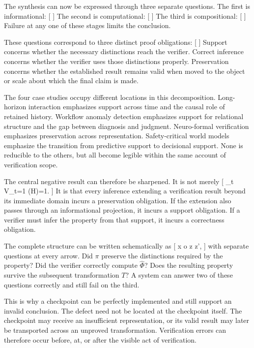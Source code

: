 \documentclass[11pt]{article}
\begin{document}
The synthesis can now be expressed through three separate questions. The first is informational:
[
]
The second is computational:
[
]
The third is compositional:
[
]
Failure at any one of these stages limits the conclusion.

These questions correspond to three distinct proof obligations:
[
]
Support concerns whether the necessary distinctions reach the verifier. Correct inference concerns whether the verifier uses those distinctions properly. Preservation concerns whether the established result remains valid when moved to the object or scale about which the final claim is made.

The four case studies occupy different locations in this decomposition. Long-horizon interaction emphasizes support across time and the causal role of retained history. Workflow anomaly detection emphasizes support for relational structure and the gap between diagnosis and judgment. Neuro-formal verification emphasizes preservation across representation. Safety-critical world models emphasize the transition from predictive support to decisional support. None is reducible to the others, but all become legible within the same account of verification scope.

The central negative result can therefore be sharpened. It is not merely
[
\bigwedge_t V_t=1
\not\Rightarrow
\Phi(H)=1.
]
It is that every inference extending a verification result beyond its immediate domain incurs a preservation obligation. If the extension also passes through an informational projection, it incurs a support obligation. If a verifier must infer the property from that support, it incurs a correctness obligation.

The complete structure can be written schematically as
[
x
\xrightarrow{\pi}
o
\xrightarrow{\widehat{\Phi}}
z
z',
]
with separate questions at every arrow. Did $\pi$ preserve the distinctions required by the property? Did the verifier correctly compute $\widehat{\Phi}$? Does the resulting property survive the subsequent transformation $T$? A system can answer two of these questions correctly and still fail on the third.

This is why a checkpoint can be perfectly implemented and still support an invalid conclusion. The defect need not be located at the checkpoint itself. The checkpoint may receive an insufficient representation, or its valid result may later be transported across an unproved transformation. Verification errors can therefore occur before, at, or after the visible act of verification.
\end{document}
